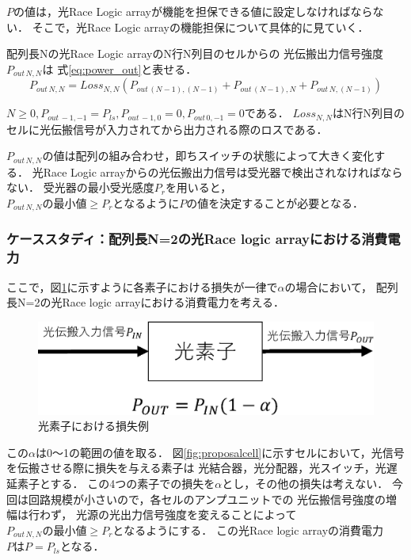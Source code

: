 $P$の値は，光Race Logic arrayが機能を担保できる値に設定しなければならない．
そこで，光Race Logic arrayの機能担保について具体的に見ていく．

配列長Nの光Race Logic arrayのN行N列目のセルからの
光伝搬出力信号強度$P_{out\,N,N}$は
式\ref{eq:power_out}と表せる．
\begin{equation}
P_{out\,N,N}=Loss_{N,N}(P_{out\,(N-1),(N-1)}+P_{out\,(N-1),N}+P_{out\,N,(N-1)})
\label{eq:power_out}
\end{equation}

$N \geq 0,P_{out\,-1,-1}=P_{ls},P_{out\,-1,0}=0,P_{out\,0,-1}=0である．$
$Loss_{N,N}$はN行N列目のセルに光伝搬信号が入力されてから出力される際のロスである．

$P_{out\,N,N}$の値は配列の組み合わせ，即ちスイッチの状態によって大きく変化する．
光Race Logic arrayからの光伝搬出力信号は受光器で検出されなければならない．
受光器の最小受光感度$P_{r}$を用いると，
$P_{out\,N,N}の最小値 \geq P_{r}となるようにP$の値を決定することが必要となる．

\subsubsection{ケーススタディ：配列長N=2の光Race logic arrayにおける消費電力}
ここで，図\ref{fig:loss}に示すように各素子における損失が一律で$\alpha$の場合において，
配列長N=2の光Race logic arrayにおける消費電力を考える．
\begin{figure}[t!]
\begin{center}
\includegraphics[keepaspectratio,scale=0.5]{fig/4/loss.eps}
\caption{光素子における損失例}
\label{fig:loss}
\end{center}
\end{figure}
この$\alpha$は0〜1の範囲の値を取る．
図\ref{fig:proposalcell}に示すセルにおいて，光信号を伝搬させる際に損失を与える素子は
光結合器，光分配器，光スイッチ，光遅延素子とする．
この4つの素子での損失を$\alpha$とし，その他の損失は考えない．
今回は回路規模が小さいので，各セルのアンプユニットでの
光伝搬信号強度の増幅は行わず，
光源の光出力信号強度を変えることによって$P_{out\,N,N}の最小値 \geq P_{r}となるように$する．
この光Race logic arrayの消費電力$PはP=P_{ls}$となる．

